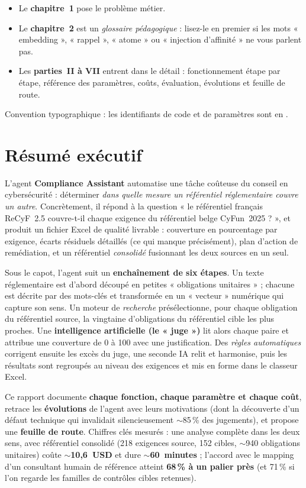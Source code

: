 \documentclass[11pt,a4paper]{report}
\newcommand{\code}[1]{\texttt{\detokenize{#1}}}
\begin{document}
\begin{itemize}[nosep]
  \item Le \textbf{chapitre~1} pose le problème métier.
  \item Le \textbf{chapitre~2} est un \emph{glossaire pédagogique} : lisez-le en premier si les mots « embedding », « rappel », « atome » ou « injection d'affinité » ne vous parlent pas.
  \item Les \textbf{parties~II à VII} entrent dans le détail : fonctionnement étape par étape, référence des paramètres, coûts, évaluation, évolutions et feuille de route.
\end{itemize}

Convention typographique : les identifiants de code et de paramètres sont en \code{police à chasse fixe}.

\chapter*{Résumé exécutif}

L'agent \textbf{Compliance Assistant} automatise une tâche coûteuse du conseil en cybersécurité : déterminer \emph{dans quelle mesure un référentiel réglementaire couvre un autre}. Concrètement, il répond à la question « le référentiel français ReCyF~2.5 couvre-t-il chaque exigence du référentiel belge CyFun~2025 ? », et produit un fichier Excel de qualité livrable : couverture en pourcentage par exigence, écarts résiduels détaillés (ce qui manque précisément), plan d'action de remédiation, et un référentiel \emph{consolidé} fusionnant les deux sources en un seul.

Sous le capot, l'agent suit un \textbf{enchaînement de six étapes}. Un texte réglementaire est d'abord découpé en petites « obligations unitaires » ; chacune est décrite par des mots-clés et transformée en un « vecteur » numérique qui capture son sens. Un moteur de \emph{recherche} présélectionne, pour chaque obligation du référentiel source, la vingtaine d'obligations du référentiel cible les plus proches. Une \textbf{intelligence artificielle (le « juge »)} lit alors chaque paire et attribue une couverture de 0 à 100 avec une justification. Des \emph{règles automatiques} corrigent ensuite les excès du juge, une seconde IA relit et harmonise, puis les résultats sont regroupés au niveau des exigences et mis en forme dans le classeur Excel.

Ce rapport documente \textbf{chaque fonction, chaque paramètre et chaque coût}, retrace les \textbf{évolutions} de l'agent avec leurs motivations (dont la découverte d'un défaut technique qui invalidait silencieusement $\sim$85\,\% des jugements), et propose une \textbf{feuille de route}. Chiffres clés mesurés : une analyse complète dans les deux sens, avec référentiel consolidé (218 exigences source, 152 cibles, $\sim$940 obligations unitaires) coûte \textbf{$\sim$10,6~USD} et dure \textbf{$\sim$60~minutes} ; l'accord avec le mapping d'un consultant humain de référence atteint \textbf{68\,\% à un palier près} (et 71\,\% si l'on regarde les familles de contrôles cibles retenues).
\end{document}
